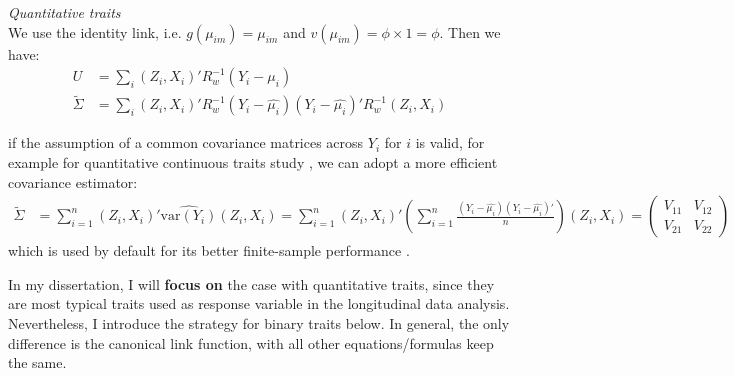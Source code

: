 \documentclass[12pt]{article}
\begin{document}
\textit{Quantitative traits}\\
\indent We use the identity link, i.e. $g(\mu_{im}) = \mu_{im}$ and $v(\mu_{im}) = \phi \times 1 = \phi$. Then we have:
\begin{align}
U & = \sum_{i}\left(Z_{i},X_{i}\right)' R_w^{-1} (Y_{i}-\mu_{i}) \nonumber\\
\widetilde{\Sigma} & = \sum_{i}\left(Z_{i},X_{i}\right)' R_w^{-1} (Y_{i}-\hat{\mu_{i}})(Y_{i}-\hat{\mu_{i}})' R_w^{-1} \left(Z_{i},X_{i}\right)
\label{eq:2}
\end{align}

if the assumption of a common covariance matrices across $Y_i$ for $i$ is valid, for example for quantitative continuous traits study \cite{pan2001robust}, we can adopt a more efficient covariance estimator:
\begin{align*}
\widetilde{\Sigma} & = \sum_{i=1}^n \left(Z_{i},X_{i}\right)'\widehat{\textrm{var}(Y_{i})}\left(Z_{i},X_{i}\right)
 = \sum_{i=1}^n \left(Z_{i},X_{i}\right)'\left(\sum_{i=1}^n \frac{(Y_{i}-\hat{\mu_{i}})(Y_{i}-\hat{\mu_{i}})'}{n}\right)\left(Z_{i},X_{i}\right) = 
\begin{pmatrix}
V_{11} & V_{12}\\
 V_{21} & V_{22}
\end{pmatrix}
\end{align*}
which is used by default for its better finite-sample performance \cite{pan2001robust}.

In my dissertation, I will \textbf{focus on} the case with quantitative traits, since they are most typical traits used as response variable in the longitudinal data analysis. Nevertheless, I introduce the strategy for binary traits below. In general, the only difference is the canonical link function, with all other equations/formulas keep the same.
\end{document}
